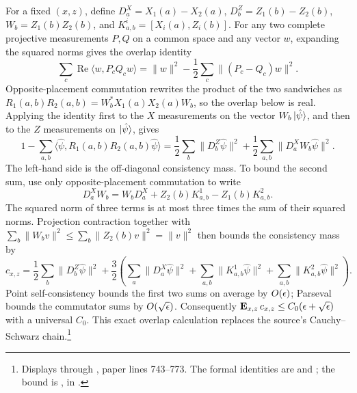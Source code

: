 \documentclass[11pt]{article}
\begin{document}
For a fixed $(x,z)$, define $D^X_a=X_1(a)-X_2(a)$,
$D^Z_b=Z_1(b)-Z_2(b)$, $W_b=Z_1(b)Z_2(b)$, and
$K^i_{a,b}=[X_i(a),Z_i(b)]$.
For any two complete projective measurements $P,Q$ on a common space and any
vector $w$, expanding the squared norms gives the overlap identity
\[
 \sum_c\operatorname{Re}\langle w,P_cQ_cw\rangle
 =\|w\|^2-\frac12\sum_c\|(P_c-Q_c)w\|^2.
\]
Opposite-placement commutation rewrites the product of the two sandwiches as
$R_1(a,b)R_2(a,b)=W_b^*X_1(a)X_2(a)W_b$, so the overlap below is real.
Applying the identity first to the $X$ measurements on the vector
$W_b\ket{\hat\psi}$, and then to the $Z$ measurements on $\ket{\hat\psi}$,
gives
\[
 1-\sum_{a,b}\langle\hat\psi,R_1(a,b)R_2(a,b)\hat\psi\rangle
 =\frac12\sum_b\|D^Z_b\hat\psi\|^2
  +\frac12\sum_{a,b}\|D^X_a W_b\hat\psi\|^2.
\]
The left-hand side is the off-diagonal consistency mass.  To bound the second
sum, use only opposite-placement commutation to write
\[
 D^X_aW_b=W_bD^X_a+Z_2(b)K^1_{a,b}-Z_1(b)K^2_{a,b}.
\]
The squared norm of three terms is at most three times the sum of their
squared norms.  Projection contraction together with
$\sum_b\|W_bv\|^2\leq\sum_b\|Z_2(b)v\|^2=\|v\|^2$ then bounds the consistency
mass by
\[
 c_{x,z}=\frac12\sum_b\|D^Z_b\hat\psi\|^2
  +\frac32\left(\sum_a\|D^X_a\hat\psi\|^2
    +\sum_{a,b}\|K^1_{a,b}\hat\psi\|^2
    +\sum_{a,b}\|K^2_{a,b}\hat\psi\|^2\right).
\]
Point self-consistency bounds the first two sums on average by $O(\epsilon)$;
Parseval bounds the commutator sums by $O(\sqrt{\epsilon})$.  Consequently
$\mathop{\bf E\/}_{x,z}c_{x,z}\leq C_0(\epsilon+\sqrt{\epsilon})$ with a universal $C_0$.
This exact overlap calculation replaces the source's Cauchy--Schwarz
chain.\footnote{Displays  through
, paper lines 743--773.  The formal identities
are  and
; the bound is
, in .}
\end{document}
